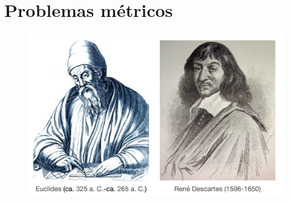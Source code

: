 
\chapter{Problemas métricos}
	





\begin{myblock}

	\begin{figure}[H]
		\centering
		\includegraphics[width=1\textwidth]{imagenes/imagenes11/euclides-descartes.png}
	\end{figure}

\end{myblock}


